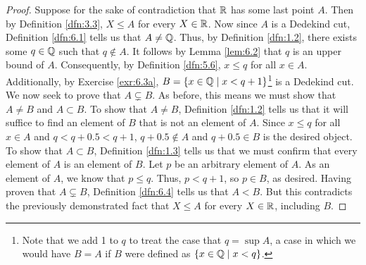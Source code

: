 \documentclass[../main.tex]{subfiles}
\begin{document}
\begin{exercise}
\begin{proof}
        Suppose for the sake of contradiction that $\mathbb{R}$ has some last point $A$. Then by Definition \ref{dfn:3.3}, $X\leq A$ for every $X\in\mathbb{R}$. Now since $A$ is a Dedekind cut, Definition \ref{dfn:6.1} tells us that $A\neq\mathbb{Q}$. Thus, by Definition \ref{dfn:1.2}, there exists some $q\in\mathbb{Q}$ such that $q\notin A$. It follows by Lemma \ref{lem:6.2} that $q$ is an upper bound of $A$. Consequently, by Definition \ref{dfn:5.6}, $x\leq q$ for all $x\in A$. Additionally, by Exercise \ref{exr:6.3a}, $B=\{x\in\mathbb{Q}\mid x<q+1\}$\footnote{Note that we add 1 to $q$ to treat the case that $q=\sup A$, a case in which we would have $B=A$ if $B$ were defined as $\{x\in\mathbb{Q}\mid x<q\}$.} is a Dedekind cut. We now seek to prove that $A\subsetneq B$. As before, this means we must show that $A\neq B$ and $A\subset B$. To show that $A\neq B$, Definition \ref{dfn:1.2} tells us that it will suffice to find an element of $B$ that is not an element of $A$. Since $x\leq q$ for all $x\in A$ and $q<q+0.5<q+1$, $q+0.5\notin A$ and $q+0.5\in B$ is the desired object. To show that $A\subset B$, Definition \ref{dfn:1.3} tells us that we must confirm that every element of $A$ is an element of $B$. Let $p$ be an arbitrary element of $A$. As an element of $A$, we know that $p\leq q$. Thus, $p<q+1$, so $p\in B$, as desired. Having proven that $A\subsetneq B$, Definition \ref{dfn:6.4} tells us that $A<B$. But this contradicts the previously demonstrated fact that $X\leq A$ for every $X\in\mathbb{R}$, including $B$.
    \end{proof}
\end{exercise}
\end{document}
